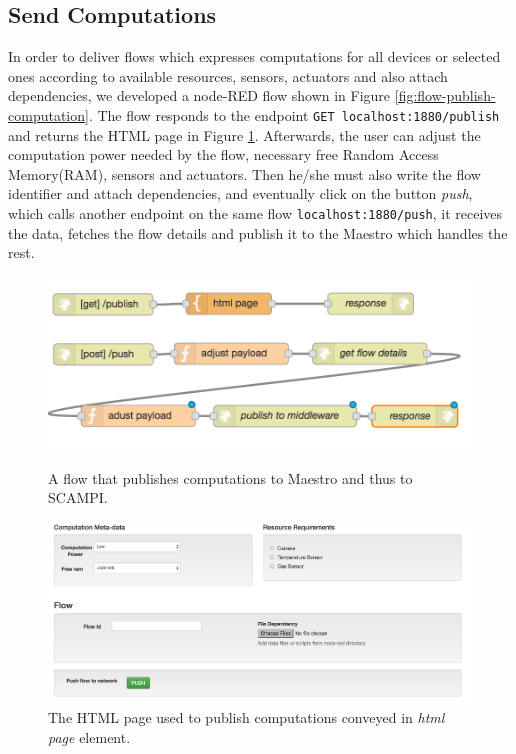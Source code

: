 \subsection{Send Computations}\label{subsec:send-comp}
In order to deliver flows which expresses computations for all devices or selected ones according to available resources,  sensors, actuators and also attach dependencies, we developed a node-RED flow shown in Figure \ref{fig:flow-publish-computation}. The flow responds to the endpoint \verb|GET localhost:1880/publish| and returns the HTML page in Figure \ref{fig:html-publish}. Afterwards, the user can adjust the computation power needed by the flow, necessary free Random Access Memory(RAM), sensors and actuators. Then he/she must also write the flow identifier and attach dependencies, and eventually click on the button \textit{push}, which calls another endpoint on the same flow \verb|localhost:1880/push|, it receives the data, fetches the flow details and publish it to the Maestro which handles the rest.
 \begin{figure}[H]
	\centering
	\includegraphics[scale=0.6]{images/flow-publish-computation.png}
	\caption{A flow that publishes computations to Maestro and thus to SCAMPI.}
	\label{fig:flow-publish-computation}
	\centering
	\includegraphics[scale=0.4]{images/html-publish.png}
	\caption{The HTML page used to publish computations conveyed in \textit{html page} element.}
	\label{fig:html-publish}
\end{figure}


